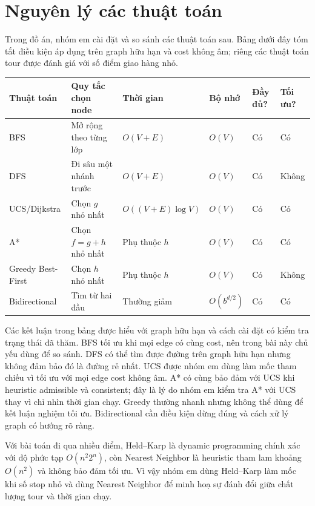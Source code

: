 \section{Nguyên lý các thuật toán}
Trong đồ án, nhóm em cài đặt và so sánh các thuật toán sau. Bảng dưới đây tóm tắt điều kiện áp dụng trên graph hữu hạn và cost không âm; riêng các thuật toán tour được đánh giá với số điểm giao hàng nhỏ.

{\footnotesize
\begin{tabularx}{\textwidth}{>{\raggedright\arraybackslash}p{2.0cm} >{\raggedright\arraybackslash}X >{\raggedright\arraybackslash}p{2.4cm} >{\raggedright\arraybackslash}p{1.2cm} >{\raggedright\arraybackslash}p{1.2cm} >{\raggedright\arraybackslash}p{1.2cm}}
\toprule
Thuật toán & Quy tắc chọn node & Thời gian & Bộ nhớ & Đầy đủ? & Tối ưu?\\
\midrule
BFS & Mở rộng theo từng lớp & \(O(V+E)\) & \(O(V)\) & Có & Có\\
DFS & Đi sâu một nhánh trước & \(O(V+E)\) & \(O(V)\) & Có & Không\\
UCS/Dijkstra & Chọn \(g\) nhỏ nhất & \(O((V+E)\log V)\) & \(O(V)\) & Có & Có\\
A* & Chọn \(f=g+h\) nhỏ nhất & Phụ thuộc \(h\) & \(O(V)\) & Có & Có\\
Greedy Best-First & Chọn \(h\) nhỏ nhất & Phụ thuộc \(h\) & \(O(V)\) & Có & Không\\
Bidirectional & Tìm từ hai đầu & Thường giảm & \(O(b^{d/2})\) & Có & Có\\
\bottomrule
\end{tabularx}
}

Các kết luận trong bảng được hiểu với graph hữu hạn và cách cài đặt có kiểm tra trạng thái đã thăm. BFS tối ưu khi mọi edge có cùng cost, nên trong bài này chủ yếu dùng để so sánh. DFS có thể tìm được đường trên graph hữu hạn nhưng không đảm bảo đó là đường rẻ nhất. UCS được nhóm em dùng làm mốc tham chiếu vì tối ưu với mọi edge cost không âm. A* có cùng bảo đảm với UCS khi heuristic admissible và consistent; đây là lý do nhóm em kiểm tra A* với UCS thay vì chỉ nhìn thời gian chạy. Greedy thường nhanh nhưng không thể dùng để kết luận nghiệm tối ưu. Bidirectional cần điều kiện dừng đúng và cách xử lý graph có hướng rõ ràng.

Với bài toán đi qua nhiều điểm, Held--Karp là dynamic programming chính xác với độ phức tạp \(O(n^2 2^n)\), còn Nearest Neighbor là heuristic tham lam khoảng \(O(n^2)\) và không bảo đảm tối ưu. Vì vậy nhóm em dùng Held--Karp làm mốc khi số stop nhỏ và dùng Nearest Neighbor để minh hoạ sự đánh đổi giữa chất lượng tour và thời gian chạy.

